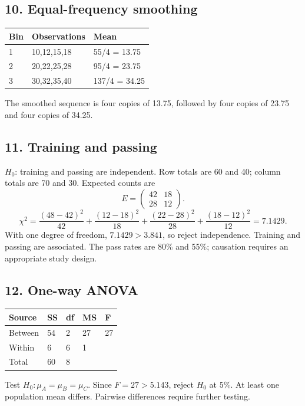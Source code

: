 \documentclass[11pt,a4paper]{article}
\begin{document}
\noindent\begin{minipage}{\linewidth}\subsection*{10. Equal-frequency smoothing}
\begin{center}\renewcommand{\arraystretch}{1.2}\begin{tabular}{lll}\hline Bin & Observations & Mean\\\hline
1 & 10,12,15,18 & 55/4 = 13.75\\
2 & 20,22,25,28 & 95/4 = 23.75\\
3 & 30,32,35,40 & 137/4 = 34.25\\\hline\end{tabular}\end{center}The smoothed sequence is four copies of 13.75, followed by four copies of 23.75 and four copies of 34.25.
\end{minipage}\par\medskip
\noindent\begin{minipage}{\linewidth}\subsection*{11. Training and passing}

$H_0$: training and passing are independent. Row totals are 60 and 40; column totals are 70 and 30. Expected counts are
\[E=\begin{pmatrix}42&18\\28&12\end{pmatrix}.\]
\[\chi^2=\frac{(48-42)^2}{42}+\frac{(12-18)^2}{18}
+\frac{(22-28)^2}{28}+\frac{(18-12)^2}{12}
=\boxed{7.1429}.\]
With one degree of freedom, $7.1429>3.841$, so reject independence. Training and passing are associated. The pass rates are 80\% and 55\%; causation requires an appropriate study design.
\end{minipage}\par\medskip
\noindent\begin{minipage}{\linewidth}\subsection*{12. One-way ANOVA}
\begin{center}\renewcommand{\arraystretch}{1.2}\begin{tabular}{lllll}\hline Source & SS & df & MS & F\\\hline
Between & 54 & 2 & 27 & 27\\
Within & 6 & 6 & 1 & \\
Total & 60 & 8 &  & \\\hline\end{tabular}\end{center}Test $H_0:\mu_A=\mu_B=\mu_C$. Since $F=27>5.143$, reject $H_0$ at 5\%. At least one population mean differs. Pairwise differences require further testing.
\end{minipage}\par\medskip
\end{document}
